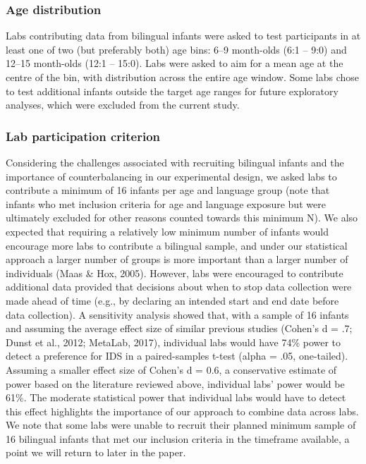 \documentclass[,man,floatsintext]{apa6}
\begin{document}
\hypertarget{age-distribution}{%
\subsubsection{Age distribution}\label{age-distribution}}

Labs contributing data from bilingual infants were asked to test participants in at least one of two (but preferably both) age bins: 6--9 month-olds (6:1 -- 9:0) and 12--15 month-olds (12:1 -- 15:0). Labs were asked to aim for a mean age at the centre of the bin, with distribution across the entire age window. Some labs chose to test additional infants outside the target age ranges for future exploratory analyses, which were excluded from the current study.

\hypertarget{lab-participation-criterion}{%
\subsubsection{Lab participation criterion}\label{lab-participation-criterion}}

Considering the challenges associated with recruiting bilingual infants and the importance of counterbalancing in our experimental design, we asked labs to contribute a minimum of 16 infants per age and language group (note that infants who met inclusion criteria for age and language exposure but were ultimately excluded for other reasons counted towards this minimum N). We also expected that requiring a relatively low minimum number of infants would encourage more labs to contribute a bilingual sample, and under our statistical approach a larger number of groups is more important than a larger number of individuals (Maas \& Hox, 2005). However, labs were encouraged to contribute additional data provided that decisions about when to stop data collection were made ahead of time (e.g., by declaring an intended start and end date before data collection). A sensitivity analysis showed that, with a sample of 16 infants and assuming the average effect size of similar previous studies (Cohen's d = .7; Dunst et al., 2012; MetaLab, 2017), individual labs would have 74\% power to detect a preference for IDS in a paired-samples t-test (alpha = .05, one-tailed). Assuming a smaller effect size of Cohen's d = 0.6, a conservative estimate of power based on the literature reviewed above, individual labs' power would be 61\%. The moderate statistical power that individual labs would have to detect this effect highlights the importance of our approach to combine data across labs. We note that some labs were unable to recruit their planned minimum sample of 16 bilingual infants that met our inclusion criteria in the timeframe available, a point we will return to later in the paper.
\end{document}

